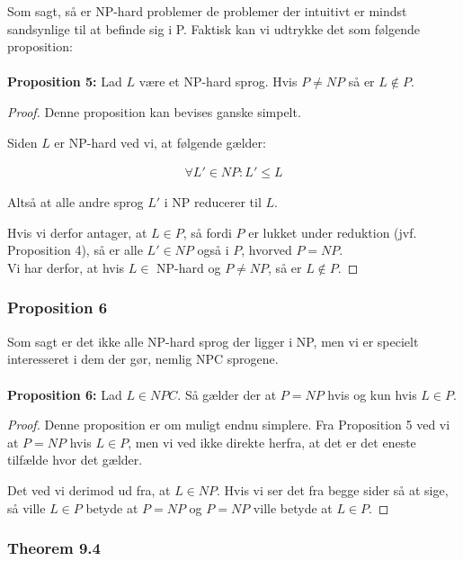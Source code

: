 Som sagt, så er NP-hard problemer de problemer der intuitivt er mindst sandsynlige til at befinde sig i P. Faktisk kan vi udtrykke det som følgende proposition:\\
~\\
\textbf{Proposition 5:} Lad $L$ være et NP-hard sprog. Hvis $P \neq NP$ så er $L \notin P$.

\begin{proof}
 Denne proposition kan bevises ganske simpelt. 

Siden $L$ er NP-hard ved vi, at følgende gælder:

\begin{align*}
 \forall L' \in NP : L' \leq L
\end{align*}

Altså at alle andre sprog $L'$ i NP reducerer til $L$.

Hvis vi derfor antager, at $L \in P$, så fordi $P$ er lukket under reduktion (jvf. Proposition 4), så er alle $L' \in NP$ også i $P$, hvorved $P=NP$. \\

Vi har derfor, at hvis $L \in$ NP-hard og $P \neq NP$, så er $L \notin P$.

\end{proof}


\subsubsection{Proposition 6}

Som sagt er det ikke alle NP-hard sprog der ligger i NP, men vi er specielt interesseret i dem der gør, nemlig NPC sprogene.\\
~\\
\textbf{Proposition 6:} Lad $L \in NPC$. Så gælder der at $P=NP$ hvis og kun hvis $L \in P$.

\begin{proof}
 Denne proposition er om muligt endnu simplere. Fra Proposition 5 ved vi at $P=NP$ hvis $L \in P$, men vi ved ikke direkte herfra, at det er det eneste tilfælde hvor det gælder. 

Det ved vi derimod ud fra, at $L \in NP$. Hvis vi ser det fra begge sider så at sige, så ville $L \in P$ betyde at $P=NP$ og $P=NP$ ville betyde at $L \in P$.
\end{proof}

\subsubsection{Theorem 9.4}

